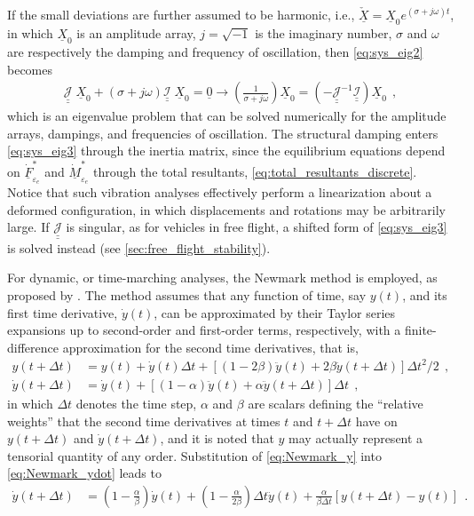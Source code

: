 \documentclass[12pt,a4paper,oneside,english]{abntex2} %
\newcommand{\fix}[1]{{\color{red}#1}}
\newcommand{\vect}[1]{\underline{#1}}
\def\tens#1{\underline{\underline{#1}}}
\def\lb{\left[}
\def\rb{\right]}
\def\lp{\left(}
\def\rp{\right)}
\def\F{\vect{F}}
\def\M{\vect{M}}
\def\zv{\vect{0}}
\def\Fsepsdote{\dot{\F}^*_{\varepsilon_e}}
\def\Msepsdote{\dot{\M}^*_{\varepsilon_e}}
\def\X{\vect{X}}
\def\Xv{\check{{\X}}}
\def\Xz{\X_0}
\def\JacSys{\tens{\mathcal{J}}}
\def\MassSys{\tens{\mathcal{I}}}
\def\dt{\Delta t}
\def\ydot{\dot{y}}
\def\yddot{\ddot{y}}
\def\dt{\Delta t}
\begin{document}
If the small deviations are further assumed to be harmonic, i.e., $\Xv = \Xz e^{\lp\sigma+j\omega\rp t}$, in which $\Xz$ is an amplitude array, $j = \sqrt{-1}$ is the imaginary number, $\sigma$ and $\omega$ are respectively the damping and frequency of oscillation, then \cref{eq:sys_eig2} becomes
\begin{align}
    \JacSys\;\Xz+\lp\sigma+j\omega\rp\MassSys\;\Xz = \zv \rightarrow \lp\frac{1}{\sigma+j\omega}\rp\Xz = \lp-\JacSys^{-1}\MassSys\rp\Xz \ \ ,
    \label{eq:sys_eig3}
\end{align}
which is an eigenvalue problem that can be solved numerically for the amplitude arrays, dampings, and frequencies of oscillation. \fix{The structural damping enters \cref{eq:sys_eig3} through the inertia matrix, since the equilibrium equations depend on $\Fsepsdote$ and $\Msepsdote$ through the total resultants, \cref{eq:total_resultants_discrete}.} Notice that such vibration analyses effectively perform a linearization about a deformed configuration, in which displacements and rotations may be arbitrarily large. \fix{If $\JacSys$ is singular, as for vehicles in free flight, a shifted form of \cref{eq:sys_eig3} is solved instead (see \cref{sec:free_flight_stability}).}

For dynamic, or time-marching analyses, the Newmark method is employed, as proposed by . The method assumes that any function of time, say $y(t)$, and its first time derivative, $\ydot(t)$, can be approximated by their Taylor series expansions up to second-order and first-order terms, respectively, with a finite-difference approximation for the second time derivatives, that is,
\begin{align}
    y(t+\dt) &= y(t) + \ydot(t)\dt + \lb\lp1-2\beta\rp\yddot(t)+2\beta\yddot(t+\dt)\rb\dt^2/2 \ \ , \label{eq:Newmark_y}
    \\
    \ydot(t+\dt) &= \ydot(t) + \lb\lp1-\alpha\rp\yddot(t)+\alpha\yddot(t+\dt)\rb\dt \ \ ,
    \label{eq:Newmark_ydot}
\end{align}
in which $\dt$ denotes the time step, $\alpha$ and $\beta$ are scalars defining the ``relative weights'' that the second time derivatives at times $t$ and $t+\dt$ have on $y(t+\dt)$ and $\ydot(t+\dt)$, and it is noted that $y$ may actually represent a tensorial quantity of any order. Substitution of \cref{eq:Newmark_y} into \cref{eq:Newmark_ydot} leads to 
\begin{align}
    \ydot(t+\dt) &= \lp1-\frac{\alpha}{\beta}\rp\ydot(t) + \lp1-\frac{\alpha}{2\beta}\rp\dt\yddot(t) +  \frac{\alpha}{\beta\dt} \lb y(t+\dt)-y(t) \rb \ \ .
    \label{eq:Newmark_ydot2}
\end{align}
\end{document}
